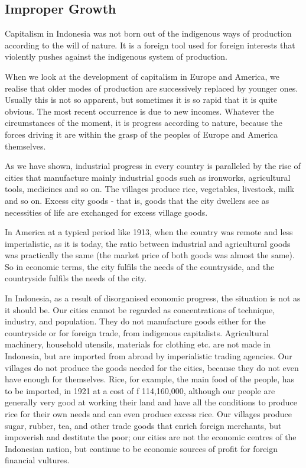 \subsection{Improper Growth}

Capitalism in Indonesia was not born out of the indigenous ways of production 
according to the will of nature. It is a foreign tool used for foreign interests 
that violently pushes against the indigenous system of production.\vskip 0.2in

When we look at the development of capitalism in Europe and America, 
we realise that older modes of production are successively replaced by 
younger ones. Usually this is not so apparent, but sometimes it is so 
rapid that it is quite obvious. The most recent occurrence is due to new incomes. 
Whatever the circumstances of the moment, it is progress according to nature, because 
the forces driving it are within the grasp of the peoples of Europe and America themselves.\vskip 0.2in

As we have shown, industrial progress in every country is paralleled by the 
rise of cities that manufacture mainly industrial goods such as ironworks, 
agricultural tools, medicines and so on. The villages produce rice, vegetables, 
livestock, milk and so on. Excess city goods - that is, goods that the city dwellers 
see as necessities of life are exchanged for excess village goods.\vskip 0.2in

In America at a typical period like 1913, when the country was remote and less 
imperialistic, as it is today, the ratio between industrial and agricultural goods 
was practically the same (the market price of both goods was almost the same). 
So in economic terms, the city fulfils the needs of the countryside, and the countryside fulfils the needs of the city.\vskip 0.2in

In Indonesia, as a result of disorganised economic progress, the situation is not as it should be. 
Our cities cannot be regarded as concentrations of technique, industry, and population. 
They do not manufacture goods either for the countryside or for foreign trade, from indigenous capitalists. 
Agricultural machinery, household utensils, materials for clothing etc. are not made in Indonesia, 
but are imported from abroad by imperialistic trading agencies. Our villages do not produce the goods 
needed for the cities, because they do not even have enough for themselves. Rice, for example, the main 
food of the people, has to be imported, in 1921 at a cost of f 114,160,000, although our people are 
generally very good at working their land and have all the conditions to produce rice for their own needs 
and can even produce excess rice. Our villages produce sugar, rubber, tea, and other trade goods that enrich 
foreign merchants, but impoverish and destitute the poor; our cities are not the economic centres of the 
Indonesian nation, but continue to be economic sources of profit for foreign financial vultures.\vskip 0.2in


